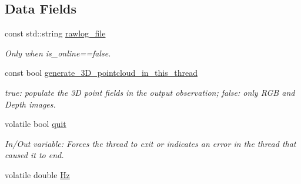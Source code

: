 \subsection*{Data Fields}
\begin{DoxyCompactItemize}
\item 
\hypertarget{struct_kinect_grabber___rawlog_1_1_t_thread_param_a8e14ab7dafc94eb16a4db364fd6a0c37}{
const std::string \hyperlink{struct_kinect_grabber___rawlog_1_1_t_thread_param_a8e14ab7dafc94eb16a4db364fd6a0c37}{rawlog\_\-file}}
\label{struct_kinect_grabber___rawlog_1_1_t_thread_param_a8e14ab7dafc94eb16a4db364fd6a0c37}

\begin{DoxyCompactList}\small\item\em Only when is\_\-online==false. \item\end{DoxyCompactList}\item 
\hypertarget{struct_kinect_grabber___rawlog_1_1_t_thread_param_a4647b7cc25bc1963cc0d175de116f30f}{
const bool \hyperlink{struct_kinect_grabber___rawlog_1_1_t_thread_param_a4647b7cc25bc1963cc0d175de116f30f}{generate\_\-3D\_\-pointcloud\_\-in\_\-this\_\-thread}}
\label{struct_kinect_grabber___rawlog_1_1_t_thread_param_a4647b7cc25bc1963cc0d175de116f30f}

\begin{DoxyCompactList}\small\item\em true: populate the 3D point fields in the output observation; false: only RGB and Depth images. \item\end{DoxyCompactList}\item 
\hypertarget{struct_kinect_grabber___rawlog_1_1_t_thread_param_a32ec19b416203aebb2993d6466a86a15}{
volatile bool \hyperlink{struct_kinect_grabber___rawlog_1_1_t_thread_param_a32ec19b416203aebb2993d6466a86a15}{quit}}
\label{struct_kinect_grabber___rawlog_1_1_t_thread_param_a32ec19b416203aebb2993d6466a86a15}

\begin{DoxyCompactList}\small\item\em In/Out variable: Forces the thread to exit or indicates an error in the thread that caused it to end. \item\end{DoxyCompactList}\item 
\hypertarget{struct_kinect_grabber___rawlog_1_1_t_thread_param_aac0203113ffaad5599395431050ac37a}{
volatile double \hyperlink{struct_kinect_grabber___rawlog_1_1_t_thread_param_aac0203113ffaad5599395431050ac37a}{Hz}}
\label{struct_kinect_grabber___rawlog_1_1_t_thread_param_aac0203113ffaad5599395431050ac37a}


\end{DoxyCompactItemize}
